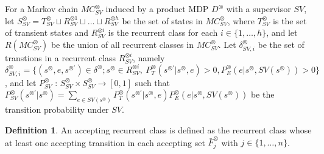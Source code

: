 \documentclass[10pt]{article}
\theoremstyle{definition}
\newtheorem{definition}{Definition}
\begin{document}
For a Markov chain $MC^{\otimes}_{SV}$ induced by a product MDP $D^{\otimes}$ with a supervisor $SV$, let $S^{\otimes}_{SV}= T^{\otimes}_{SV} \sqcup R^{\otimes 1}_{SV} \sqcup \ldots \sqcup R^{\otimes h}_{SV}$ be the set of states in $MC^{\otimes}_{SV}$, where $T^{\otimes}_{SV}$ is the set of transient states and $R^{\otimes i}_{SV}$ is the recurrent class for each $i \in \{ 1, \ldots ,h \}$, and let $R(MC^{\otimes}_{SV})$ be the union of all recurrent classes in $MC^{\otimes}_{SV}$. Let $\delta^{\otimes}_{SV,i}$ be the set of transtions in a recurrent class $R^{\otimes i}_{SV}$, namely $\delta^{\otimes}_{SV,i} = \{ (s^{\otimes}, e, s^{\otimes \prime}) \in \delta^{\otimes} ; s^{\otimes} \in R^{\otimes i}_{SV},\ P^{\otimes}_T(s^{\otimes \prime}|s^{\otimes}, e) > 0, P^{\otimes}_E(e | s^{\otimes}, SV(s^{\otimes})) > 0 \}$, and let $P^{\otimes}_{SV}$ : $S^{\otimes}_{SV} \times S^{\otimes}_{SV} \rightarrow [0,1]$ such that $P^{\otimes}_{SV} (s^{\otimes \prime} | s^{\otimes}) = \sum_{e \in SV(s^{\otimes})} P^{\otimes}_T (s^{\otimes \prime} | s^{\otimes}, e) P^{\otimes}_E (e | s^{\otimes}, SV(s^{\otimes}))$ be the transition probability under $SV$.

\begin{definition}
  An accepting recurrent class is defined as the recurrent class whose at least one accepting transition in each accepting set $\bar{F}^{\otimes}_j$ with $j \in \{ 1, \ldots, n \}$.
\end{definition}
\end{document}
